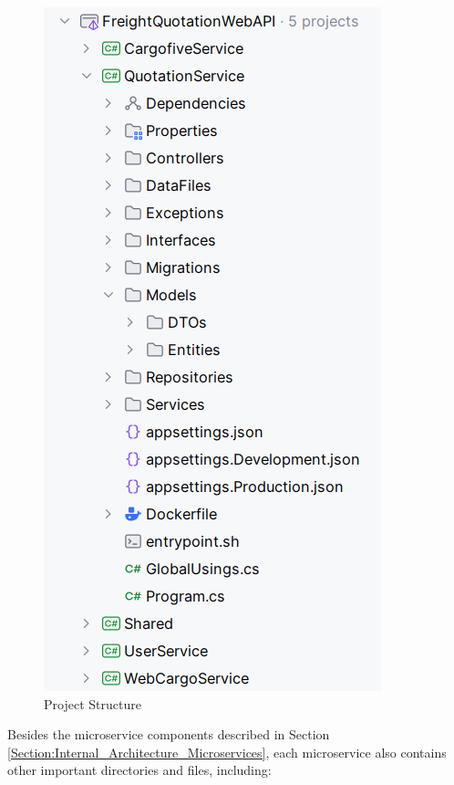 \documentclass[12pt, reqno]{amsbook}
\theoremstyle{definition}
\theoremstyle{definition}
\numberwithin{section}{chapter}
\numberwithin{table}{chapter}
\numberwithin{figure}{chapter}
\begin{document}
\begin{figure}[H]
  \centering
  \includegraphics[width=0.5\linewidth]{images/ProjectStructure.png}
  \caption{\label{Figure:ProjectStructure}Project Structure}
\end{figure}

Besides the microservice components described in Section \ref{Section:Internal_Architecture_Microservices}, each microservice also contains other important directories and files, including:
\end{document}
